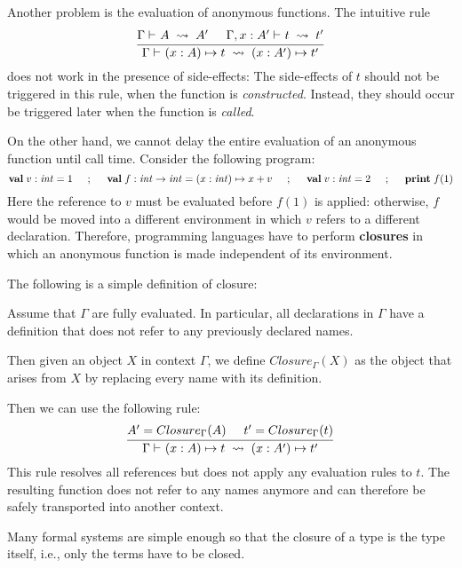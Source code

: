 Another problem is the evaluation of anonymous functions.
The intuitive rule
\[\rul{\evobj{}{\Gamma}{A}{A'} \tb \evobj{}{\Gamma,x:A'}{t}{t'}}
      {\evobj{}{\Gamma}{\alam[A]{x}{t}}{\alam[A']{x}{t'}}}
\]
does not work in the presence of side-effects: The side-effects of $t$ should not be triggered in this rule, when the function is \emph{constructed}.
Instead, they should occur be triggered later when the function is \emph{called}.

On the other hand, we cannot delay the entire evaluation of an anonymous function until call time.
Consider the following program:
\[\aval{v}{\Int}{1} \tb;\tb \aval{f}{\Int\to\Int}{\alam[\Int]{x}{x+v}} \tb ; \tb \aval{v}{\Int}{2} \tb ;\tb \aprint{f(1)}\]
Here the reference to $v$ must be evaluated before $f(1)$ is applied: otherwise, $f$ would be moved into a different environment in which $v$ refers to a different declaration.
Therefore, programming languages have to perform \textbf{closures} in which an anonymous function is made independent of its environment.

The following is a simple definition of closure:

\begin{definition}[Closure]
Assume that $\Gamma$ are fully evaluated.
In particular, all declarations in $\Gamma$ have a definition that does not refer to any previously declared names.

Then given an object $X$ in context $\Gamma$, we define $Closure_\Gamma(X)$ as the object that arises from $X$ by replacing every name with its definition.
\end{definition}

Then we can use the following rule:
\[\rul{A'=Closure_\Gamma(A) \tb t'=Closure_\Gamma(t)}
      {\evobj{}{\Gamma}{\alam[A]{x}{t}}{\alam[A']{x}{t'}}}
\]
This rule resolves all references but does not apply any evaluation rules to $t$.
The resulting function does not refer to any names anymore and can therefore be safely transported into another context.

Many formal systems are simple enough so that the closure of a type is the type itself, i.e., only the terms have to be closed.
